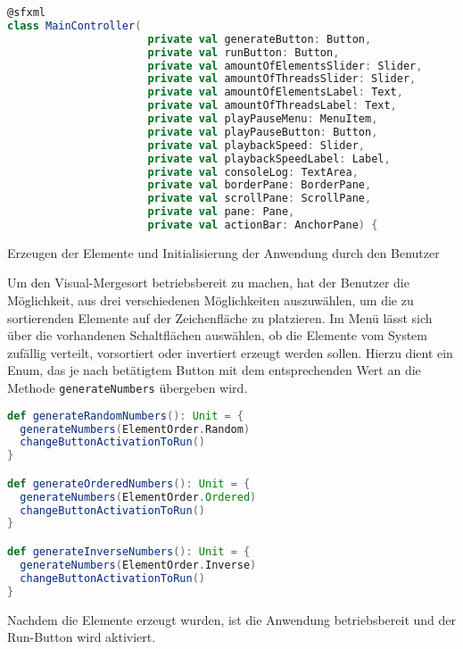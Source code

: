 \begin{lstlisting}[language=Scala,caption=Erzeugen der Elemente und Initialisierung der Anwendung durch den Benutzer]
@sfxml
class MainController(
                      private val generateButton: Button,
                      private val runButton: Button,
                      private val amountOfElementsSlider: Slider,
                      private val amountOfThreadsSlider: Slider,
                      private val amountOfElementsLabel: Text,
                      private val amountOfThreadsLabel: Text,
                      private val playPauseMenu: MenuItem,
                      private val playPauseButton: Button,
                      private val playbackSpeed: Slider,
                      private val playbackSpeedLabel: Label,
                      private val consoleLog: TextArea,
                      private val borderPane: BorderPane,
                      private val scrollPane: ScrollPane,
                      private val pane: Pane,
                      private val actionBar: AnchorPane) {
\end{lstlisting}

Erzeugen der Elemente und Initialisierung der Anwendung durch den Benutzer

Um den Visual-Mergesort betriebsbereit zu machen, hat der Benutzer die Möglichkeit, aus drei verschiedenen Möglichkeiten auszuwählen, um die zu sortierenden Elemente auf der Zeichenfläche zu platzieren. Im Menü lässt sich über die vorhandenen Schaltflächen auswählen, ob die Elemente vom System zufällig verteilt, vorsortiert oder invertiert erzeugt werden sollen. Hierzu dient ein Enum, das je nach betätigtem Button mit dem entsprechenden Wert an die Methode \texttt{generateNumbers} übergeben wird.

\begin{lstlisting}[language=Scala]
def generateRandomNumbers(): Unit = {
  generateNumbers(ElementOrder.Random)
  changeButtonActivationToRun()
}

def generateOrderedNumbers(): Unit = {
  generateNumbers(ElementOrder.Ordered)
  changeButtonActivationToRun()
}

def generateInverseNumbers(): Unit = {
  generateNumbers(ElementOrder.Inverse)
  changeButtonActivationToRun()
}
\end{lstlisting}

Nachdem die Elemente erzeugt wurden, ist die Anwendung betriebsbereit und der Run-Button wird aktiviert.

